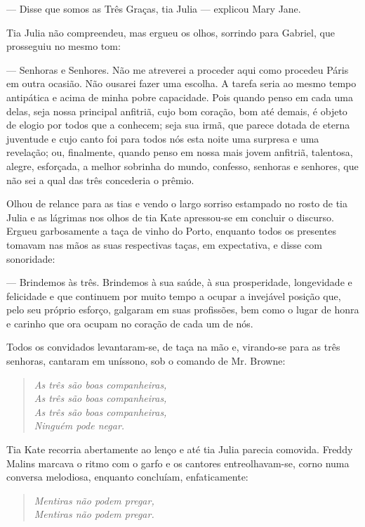 --- Disse que somos as Três Graças, tia Julia --- explicou Mary Jane.


Tia Julia não compreendeu, mas ergueu os olhos, sorrindo para Gabriel,
que prosseguiu no mesmo tom:

--- Senhoras e Senhores. Não me atreverei a proceder aqui como
procedeu Páris em outra ocasião. Não ousarei fazer uma escolha. A
tarefa seria ao mesmo tempo antipática e acima de minha pobre
capacidade. Pois quando penso em cada uma delas, seja nossa principal
anfitriã, cujo bom coração, bom até demais, é objeto de elogio por
todos que a conhecem; seja sua irmã, que parece dotada de eterna
juventude e cujo canto foi para todos nós esta noite uma surpresa e
uma revelação; ou, finalmente, quando penso em nossa mais jovem
anfitriã, talentosa, alegre, esforçada, a melhor sobrinha do mundo,
confesso, senhoras e senhores, que não sei a qual das três concederia
o prêmio.

Olhou de relance para as tias e vendo o largo sorriso estampado no
rosto de tia Julia e as lágrimas nos olhos de tia Kate apressou-se em
concluir o discurso. Ergueu garbosamente a taça de vinho do Porto,
enquanto todos os presentes tomavam nas mãos as suas respectivas
taças, em expectativa, e disse com sonoridade:

--- Brindemos às três. Brindemos à sua saúde, à sua prosperidade,
longevidade e felicidade e que continuem por muito tempo a ocupar a
invejável posição que, pelo seu próprio esforço, galgaram em suas
profissões, bem como o lugar de honra e carinho que ora ocupam no
coração de cada um de nós.

Todos os convidados levantaram-se, de taça na mão e, virando-se para
as três senhoras, cantaram em uníssono, sob o comando de Mr. Browne:

\begin{verse}{\itshape
As três são boas companheiras,\\
As três são boas companheiras,\\
As três são boas companheiras,\\
Ninguém pode negar.}
\end{verse}

Tia Kate recorria abertamente ao lenço e até tia Julia parecia
comovida. Freddy Malins marcava o ritmo com o garfo e os cantores
entreolhavam-se, corno numa conversa melodiosa, enquanto concluíam,
enfaticamente:

\begin{verse}{\itshape
Mentiras não podem pregar,\\
Mentiras não podem pregar.}
\end{verse}

